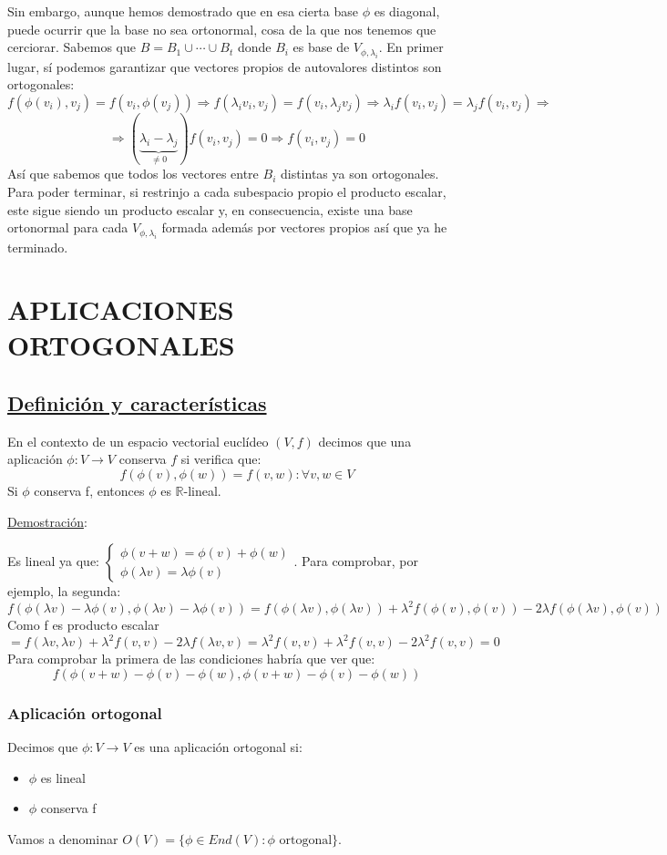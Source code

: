 \documentclass[10pt,a4paper,openright]{book}
\begin{document}
Sin embargo, aunque hemos demostrado que en esa cierta base $\phi$ es diagonal, puede ocurrir que la base no sea ortonormal, cosa de la que nos tenemos que cerciorar. Sabemos que $B=B_1\cup \cdots \cup B_t$ donde $B_i$ es base de $V_{\phi, \lambda_i}$. En primer lugar, sí podemos garantizar que vectores propios de autovalores distintos son ortogonales:
$$f(\phi(v_i), v_j) = f(v_i, \phi(v_j))\Rightarrow f(\lambda_iv_i, v_j) = f(v_i, \lambda_j v_j) \Rightarrow \lambda_i f(v_i,v_j) = \lambda_j f(v_i,v_j)\Rightarrow$$
$$\Rightarrow (\underbrace{\lambda_i -\lambda_j}_{\neq 0})f(v_i,v_j) = 0\Rightarrow f(v_i, v_j) = 0$$
Así que sabemos que todos los vectores entre $B_i$ distintas ya son ortogonales. Para poder terminar, si restrinjo a cada subespacio propio el producto escalar, este sigue siendo un producto escalar y, en consecuencia, existe una base ortonormal para cada $V_{\phi, \lambda_i}$ formada además por vectores propios así que ya he terminado.

\section*{APLICACIONES ORTOGONALES}
\subsection*{\underline{Definición y características}}
En el contexto de un espacio vectorial euclídeo $(V,f)$ decimos que una aplicación $\phi: V\rightarrow V$ conserva $f$ si verifica que:
$$f(\phi(v),\phi(w)) = f(v,w): \forall v,w\in V$$
Si $\phi$ conserva f, entonces $\phi$ es $\mathbb{R}$-lineal.

\underline{Demostración}:

Es lineal ya que: $\begin{cases} \phi(v+w) = \phi(v)+\phi(w) \\ \phi(\lambda v) = \lambda \phi(v) \end{cases}$. Para comprobar, por ejemplo, la segunda:
$$f(\phi(\lambda v) - \lambda \phi(v),\phi(\lambda v) - \lambda \phi(v)) = f(\phi(\lambda v), \phi(\lambda v)) + \lambda^2 f(\phi(v),\phi(v)) - 2\lambda f(\phi(\lambda v), \phi(v)) $$
Como f es producto escalar
$$= f(\lambda v, \lambda v) + \lambda^2 f(v,v) -2\lambda f(\lambda v, v) = \lambda^2 f(v,v) + \lambda^2 f(v,v) - 2\lambda^2 f(v,v) = 0$$
Para comprobar la primera de las condiciones habría que ver que:
$$ f(\phi(v+w) - \phi(v) - \phi(w), \phi(v+w) - \phi(v) - \phi(w))$$

\subsubsection*{Aplicación ortogonal}
Decimos que $\phi: V\rightarrow V$ es una aplicación ortogonal si:
\begin{itemize}
\item $\phi$ es lineal
\item $\phi$ conserva f
\end{itemize}
Vamos a denominar $O(V) = \{\phi\in End(V): \phi \mbox{ ortogonal}\}$.
\end{document}
